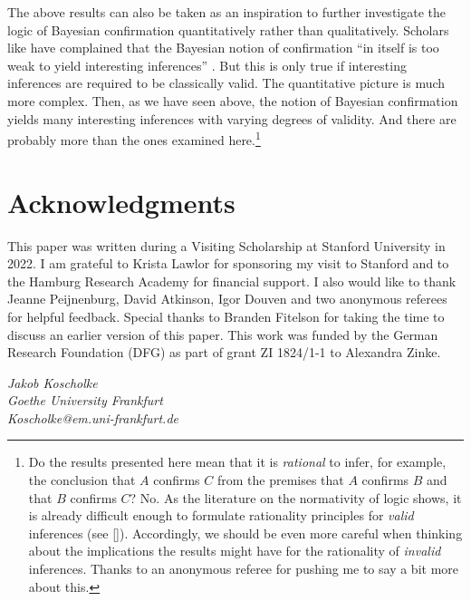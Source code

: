 \documentclass[a4paper,11pt]{article}
\begin{document}
The above results can also be taken as an inspiration to further investigate the logic of Bayesian confirmation quantitatively rather than qualitatively. Scholars like \cite{Pearl1991} have complained that the Bayesian notion of confirmation ``in itself is too weak to yield interesting inferences'' \cite[][160]{Pearl1991}. But this is only true if interesting inferences are required to be classically valid. The quantitative picture is much more complex. Then, as we have seen above, the notion of Bayesian confirmation yields many interesting inferences with varying degrees of validity. And there are probably more than the ones examined here.\footnote{Do the results presented here mean that it is \emph{rational} to infer, for example, the conclusion that $A$ confirms $C$ from the premises that $A$ confirms $B$ and that $B$ confirms $C$? No. As the literature on the normativity of logic shows, it is already difficult enough to formulate rationality principles for \emph{valid} inferences (see \citeauthor{Steinberger2017} [\citeyear{Steinberger2017}]). Accordingly, we should be even more careful when thinking about the implications the results might have for the rationality of \emph{invalid} inferences. Thanks to an anonymous referee for pushing me to say a bit more about this.}


\section*{Acknowledgments}

This paper was written during a Visiting Scholarship at Stanford University in 2022. I am grateful to Krista Lawlor for sponsoring my visit to Stanford and to the Hamburg Research Academy for financial support. I also would like to thank Jeanne Peijnenburg, David Atkinson, Igor Douven and two anonymous referees for helpful feedback. Special thanks to Branden Fitelson for taking the time to discuss an earlier version of this paper. This work was funded by the German Research Foundation (DFG) as part of grant ZI 1824/1-1 to Alexandra Zinke.

\hfill

\begin{flushright}
\emph{Jakob Koscholke\\Goethe University Frankfurt\\
Koscholke@em.uni-frankfurt.de}
\end{flushright}
\end{document}
